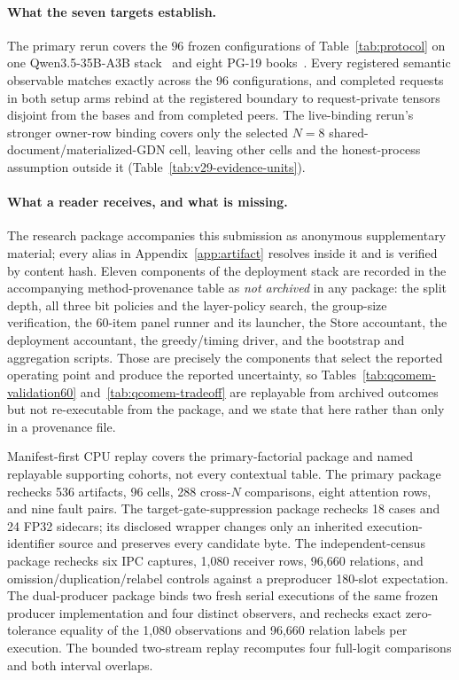\documentclass{article}
\begin{document}
\paragraph{What the seven targets establish.}
The primary rerun covers the $96$ frozen configurations of
Table~\ref{tab:protocol} on one
Qwen3.5-35B-A3B stack~\citep{qwen2026qwen35,qwen2026qwen35modelcard} and eight
PG-19 books~\citep{rae2020compressive}.
Every registered semantic observable matches exactly across the 96
configurations, and completed requests in both setup arms rebind at the
registered boundary to request-private tensors disjoint from the bases and from
completed peers.  The live-binding rerun's stronger owner-row binding covers only
the selected $N=8$ shared-document/materialized-GDN cell, leaving other cells and
the honest-process assumption outside it (Table~\ref{tab:v29-evidence-units}).

\paragraph{What a reader receives, and what is missing.}
The research package accompanies this submission as anonymous supplementary
material; every alias in Appendix~\ref{app:artifact} resolves inside it and is
verified by content hash.  Eleven components of the deployment stack are
recorded in the accompanying method-provenance table as \emph{not archived} in
any package: the split depth, all three bit policies and the layer-policy
search, the group-size verification, the 60-item panel runner and its launcher,
the Store accountant, the deployment accountant, the greedy/timing driver, and
the bootstrap and aggregation scripts.  Those are precisely the components that
select the reported operating point and produce the reported uncertainty, so
Tables~\ref{tab:qcomem-validation60} and~\ref{tab:qcomem-tradeoff} are
replayable from archived outcomes but not re-executable from the package, and we
state that here rather than only in a provenance file.

Manifest-first CPU replay covers the primary-factorial package and named
replayable supporting cohorts, not every contextual table.  The primary package
rechecks 536 artifacts, 96 cells, 288 cross-$N$ comparisons, eight attention
rows, and nine fault pairs.  The target-gate-suppression package rechecks 18
cases and 24 FP32 sidecars; its disclosed wrapper changes only an inherited
execution-identifier source and preserves every candidate byte.  The
independent-census package rechecks six IPC captures, 1,080 receiver rows,
96,660 relations, and omission/duplication/relabel controls against a
preproducer 180-slot expectation.  The dual-producer package binds two fresh
serial executions of the same frozen producer implementation and four distinct
observers, and rechecks exact zero-tolerance equality of the 1,080 observations
and 96,660 relation labels per execution.  The
bounded two-stream replay recomputes four full-logit comparisons and both
interval overlaps.
\end{document}
